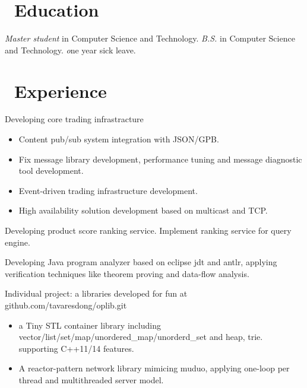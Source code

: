 \documentclass{resume}
\begin{document}


 
\section{\faGraduationCap\ Education}
\textit{Master student} in Computer Science and Technology.
\textit{B.S.} in Computer Science and Technology.
\textit one year sick leave.

\section{\faUsers\ Experience}
Developing core trading infrastracture
\begin{itemize}
  \item Content pub/sub system integration with JSON/GPB.
  \item Fix message library development, performance tuning and message diagnostic tool development.
  \item Event-driven trading infrastructure development.
  \item High availability solution development based on multicast and TCP.
\end{itemize}

Developing product score ranking service. Implement ranking service for query engine.

Developing Java program analyzer based on eclipse jdt and
antlr, applying verification techniques like theorem proving and data-flow analysis.

Individual project: a libraries developed for fun at
github.com/tavaresdong/oplib.git
\begin{itemize}
  \item a Tiny STL container library including vector/list/set/map/unordered\_map/unorderd\_set and heap, trie. supporting C++11/14 features.
  \item A reactor-pattern network library mimicing muduo, applying one-loop per thread and multithreaded server model.
\end{itemize}
\end{document}
